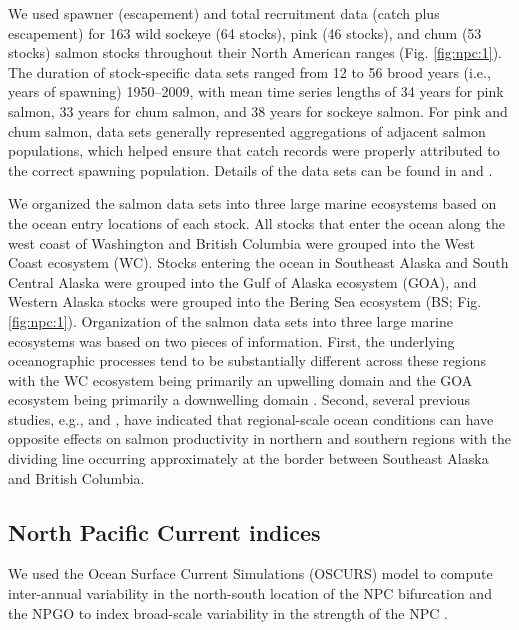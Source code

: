 We used spawner (escapement) and total recruitment data (catch plus escapement)
for 163 wild sockeye (64 stocks), pink (46 stocks), and chum (53 stocks) salmon
stocks throughout their North American ranges (Fig. \ref{fig:npc:1}). The
duration of stock-specific data sets ranged from 12 to 56 brood years (i.e.,
years of spawning) 1950--2009, with mean time series lengths of 34 years for
pink salmon, 33 years for chum salmon, and 38 years for sockeye salmon. For pink
and chum salmon, data sets generally represented aggregations of adjacent salmon
populations, which helped ensure that catch records were properly attributed to
the correct spawning population. Details of the data sets can be found in
\citet{Peterman2012} and \citet{Malick2016a}.

We organized the salmon data sets into three large marine ecosystems based on
the ocean entry locations of each stock. All stocks that enter the ocean along
the west coast of Washington and British Columbia were grouped into the West
Coast ecosystem (WC). Stocks entering the ocean in Southeast Alaska and South
Central Alaska were grouped into the Gulf of Alaska ecosystem (GOA), and Western
Alaska stocks were grouped into the Bering Sea ecosystem (BS; Fig.
\ref{fig:npc:1}). Organization of the salmon data sets into three large marine
ecosystems was based on two pieces of information. First, the underlying
oceanographic processes tend to be substantially different across these regions
with the WC ecosystem being primarily an upwelling domain and the GOA ecosystem
being primarily a downwelling domain \citep{Ware1989a}. Second, several previous
studies, e.g., \citet{Malick2015a} and \citet{Mueter2002a}, have indicated that
regional-scale ocean conditions can have opposite effects on salmon productivity
in northern and southern regions with the dividing line occurring approximately
at the border between Southeast Alaska and British Columbia.


\subsection{North Pacific Current indices}

We used the Ocean Surface Current Simulations (OSCURS) model to compute
inter-annual variability in the north-south location of the NPC bifurcation
\citep{Ingraham1997a} and the NPGO to index broad-scale variability in the
strength of the NPC \citep{Di-Lorenzo2008a}.

